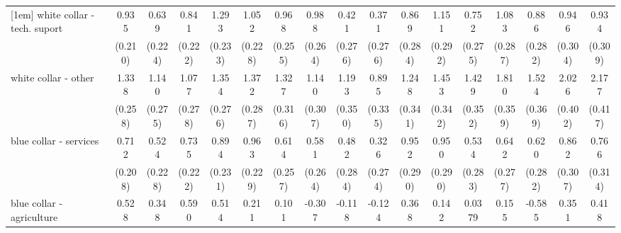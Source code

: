 {\begin{tabular}{l*{16}{c}}
[1em]
white collar - tech. suport&       0.935\sym{***}&       0.639\sym{**} &       0.841\sym{***}&       1.293\sym{***}&       1.052\sym{***}&       0.968\sym{***}&       0.988\sym{***}&       0.421         &       0.371         &       0.869\sym{**} &       1.151\sym{***}&       0.752\sym{**} &       1.083\sym{***}&       0.886\sym{**} &       0.946\sym{**} &       0.934\sym{**} \\
                    &     (0.210)         &     (0.224)         &     (0.222)         &     (0.233)         &     (0.228)         &     (0.255)         &     (0.264)         &     (0.276)         &     (0.276)         &     (0.284)         &     (0.292)         &     (0.275)         &     (0.287)         &     (0.282)         &     (0.304)         &     (0.309)         \\
[1em]
white collar - other&       1.338\sym{***}&       1.140\sym{***}&       1.077\sym{***}&       1.354\sym{***}&       1.372\sym{***}&       1.327\sym{***}&       1.140\sym{***}&       1.193\sym{***}&       0.895\sym{**} &       1.248\sym{***}&       1.453\sym{***}&       1.429\sym{***}&       1.810\sym{***}&       1.524\sym{***}&       2.026\sym{***}&       2.177\sym{***}\\
                    &     (0.258)         &     (0.275)         &     (0.278)         &     (0.276)         &     (0.287)         &     (0.316)         &     (0.307)         &     (0.350)         &     (0.335)         &     (0.341)         &     (0.342)         &     (0.352)         &     (0.359)         &     (0.369)         &     (0.402)         &     (0.417)         \\
[1em]
blue collar - services&       0.712\sym{***}&       0.524\sym{*}  &       0.735\sym{***}&       0.894\sym{***}&       0.963\sym{***}&       0.614\sym{*}  &       0.581\sym{*}  &       0.482         &       0.326         &       0.952\sym{**} &       0.950\sym{**} &       0.534         &       0.642\sym{*}  &       0.620\sym{*}  &       0.862\sym{**} &       0.766\sym{*}  \\
                    &     (0.208)         &     (0.228)         &     (0.222)         &     (0.231)         &     (0.229)         &     (0.257)         &     (0.264)         &     (0.284)         &     (0.274)         &     (0.290)         &     (0.290)         &     (0.283)         &     (0.277)         &     (0.282)         &     (0.307)         &     (0.314)         \\
[1em]
blue collar - agriculture&       0.528         &       0.348         &       0.590         &       0.514         &       0.211         &       0.101         &      -0.307         &      -0.118         &      -0.124         &       0.368         &       0.142         &      0.0379         &       0.155         &      -0.585         &       0.351         &       0.418         \\

\end{tabular}}
